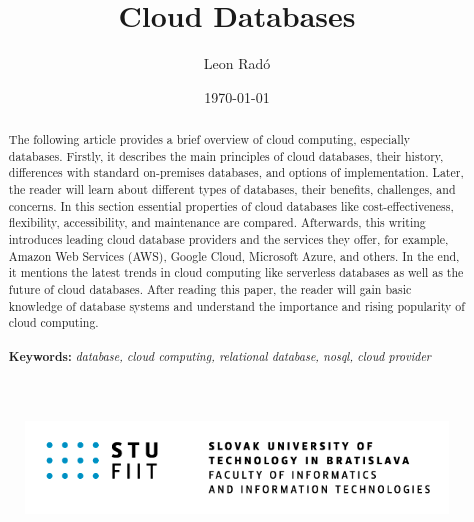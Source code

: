 \documentclass[12pt, a4paper]{article}
\title{\Huge Cloud Databases}
\author{\Large Leon Radó}
\date{\today}
\begin{document}
\maketitle
\begin{figure}[b]
    \centering
    \includegraphics[width=0.8\linewidth]{images/STU-FIIT.png}
\end{figure}
\thispagestyle{empty}

\clearpage
\tableofcontents

\clearpage
\begin{abstract}
    The following article provides a brief overview of cloud computing, especially databases. Firstly, it describes the main principles of cloud databases, their history, differences with standard on-premises databases, and options of implementation. Later, the reader will learn about different types of databases, their benefits, challenges, and concerns. In this section essential properties of cloud databases like cost-effectiveness, flexibility, accessibility, and maintenance are compared. Afterwards, this writing introduces leading cloud database providers and the services they offer, for example, Amazon Web Services (AWS), Google Cloud, Microsoft Azure, and others. In the end, it mentions the latest trends in cloud computing like serverless databases as well as the future of cloud databases. After reading this paper, the reader will gain basic knowledge of database systems and understand the importance and rising popularity of cloud computing.\\\\
    \footnotesize{
        \textbf{Keywords:}
        \textit{database, cloud computing, relational database, nosql, cloud provider}
    }
\end{abstract}
\clearpage
\end{document}
